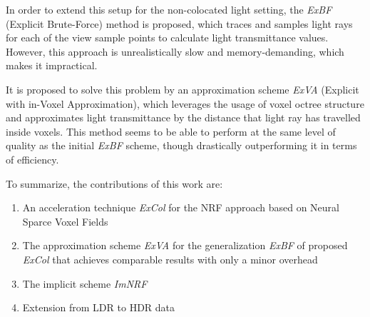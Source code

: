 In order to extend this setup for the non-colocated light setting, the \textit{ExBF} (Explicit Brute-Force) method is proposed,
which traces and samples light rays for each of the view sample points to calculate light transmittance values.
However, this approach is unrealistically slow and memory-demanding,
which makes it impractical.

It is proposed to solve this problem by an approximation scheme \textit{ExVA} (Explicit with in-Voxel Approximation),
which leverages the usage of voxel octree structure
and approximates light transmittance by the distance that light ray has travelled inside voxels.
This method seems to be able to perform at the same level of quality as the initial \textit{ExBF} scheme,
though drastically outperforming it in terms of efficiency.


To summarize, the contributions of this work are:
\begin{enumerate}
    \item An acceleration technique \textit{ExCol} for the NRF approach
    based on Neural Sparce Voxel Fields
    \item The approximation scheme \textit{ExVA}
    for the generalization \textit{ExBF} of proposed \textit{ExCol}
    that achieves comparable results with only a minor overhead
    \item The implicit scheme \textit{ImNRF} 
    \item Extension from LDR to HDR data
\end{enumerate}











